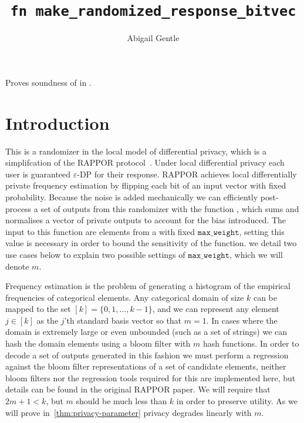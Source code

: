 \documentclass{article}
\title{\texttt{fn make\_randomized\_response\_bitvec}}
\author{Abigail Gentle}
\begin{document}
\maketitle



\contrib

Proves soundness of  in .

\section{Introduction}
This is a randomizer in the local model of differential privacy, which is a simplifcation of the RAPPOR protocol~\cite{rappor}. Under local differential privacy each user is guaranteed $\varepsilon$-DP for their response. RAPPOR achieves local differentially private frequency estimation by flipping each bit of an input vector with fixed probability. Because the noise is added mechanically we can efficiently post-process a set of outputs from this randomizer with the function , which sums and normalises a vector of private outputs to account for the bias introduced. The input to this function are elements from a  with fixed $\texttt{max\_weight}$, setting this value is necessary in order to bound the sensitivity of the function. we detail two use cases below to explain two possible settings of $\texttt{max\_weight}$, which we will denote $m$.

Frequency estimation is the problem of generating a histogram of the empirical frequencies of categorical elements. Any categorical domain of size $k$ can be mapped to the set $[k]=\{0,1,\ldots,k-1\}$, and we can represent any element $j\in[k]$ as the $j$'th standard basis vector so that $m=1$. In cases where the domain is extremely large or even unbounded (such as a set of strings) we can hash the domain elements using a bloom filter with $m$ hash functions. In order to decode a set of outputs generated in this fashion we must perform a regression against the bloom filter representations of a set of candidate elements, neither bloom filters nor the regression tools required for this are implemented here, but details can be found in the original RAPPOR paper. We will require that $2m+1<k$, but $m$ should be much less than $k$ in order to preserve utility. As we will prove in~\ref{thm:privacy-parameter} privacy degrades linearly with $m$. 
\end{document}
